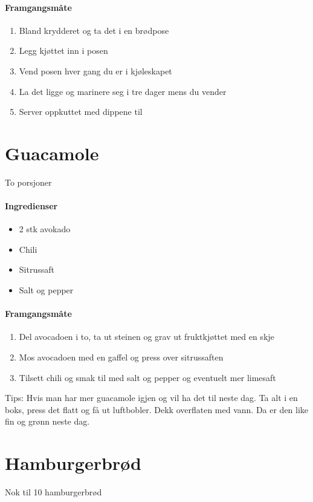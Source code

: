 \documentclass[12pt,a4paper]{book}
\begin{document}
\paragraph{Framgangsmåte}
\begin{enumerate}[noitemsep]
	\item Bland krydderet og ta det i en brødpose
	\item Legg kjøttet inn i posen
	\item Vend posen hver gang du er i kjøleskapet
	\item La det ligge og marinere seg i tre dager mens du vender
	\item Server oppkuttet med dippene til
\end{enumerate}
\clearpage{}
\clearpage{}\section{﻿Guacamole}
\label{guacamole}
To porsjoner

\paragraph{Ingredienser}
\begin{itemize}[noitemsep]
	\item 2 stk avokado
	\item Chili
	\item Sitrussaft
	\item Salt og pepper
\end{itemize}


\paragraph{Framgangsmåte}
\begin{enumerate}[noitemsep]
	\item Del avocadoen i to, ta ut steinen og grav ut fruktkjøttet med en skje
	\item Mos avocadoen med en gaffel og press over sitrussaften
	\item Tilsett chili og smak til med salt og pepper og eventuelt mer limesaft
\end{enumerate}


Tips: Hvis man har mer guacamole igjen og vil ha det til neste dag. Ta alt i en boks, press det flatt og få ut luftbobler. Dekk overflaten med vann. Da er den like fin og grønn neste dag.
\clearpage{}
\clearpage{}\section{﻿Hamburgerbrød}
Nok til 10 hamburgerbrød
\end{document}
